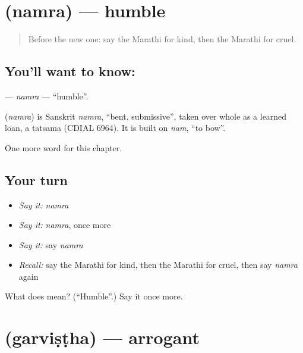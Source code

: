 \section[\texorpdfstring{\mr{नम्र} (namra)}{नम्र (namra)}]{ (namra) — humble}

\label{lesson:MR-C177-namra}



\begin{quote}
Before the new one: say the Marathi for kind, then the Marathi for cruel.
\end{quote}

\subsection*{You'll want to know: }
\textbf{} — \emph{namra} — \textquotedblleft{}humble\textquotedblright{}.

\begin{cousinweb}
\textbf{} (\emph{namra}) is Sanskrit \emph{namra}, \textquotedblleft{}bent, submissive\textquotedblright{}, taken over whole as a learned loan, a tatsama (CDIAL 6964). It is built on \emph{nam}, \textquotedblleft{}to bow\textquotedblright{}.
\end{cousinweb}

\begin{grammarlens}[title={What you've built}]
One more word for this chapter.
\end{grammarlens}

\subsection*{Your turn}
\begin{itemize}
\raggedright
  \item \emph{Say it:} \emph{namra}
  \item \emph{Say it:} \emph{namra}, once more
  \item \emph{Say it:} say \emph{namra}
  \item \emph{Recall:} say the Marathi for kind, then the Marathi for cruel, then say \emph{namra} again
\end{itemize}

\begin{tcolorbox}[breakable,colback=teal!4,colframe=teal!35!black,title={Before you move on}]
What does  mean? (\textquotedblleft{}Humble\textquotedblright{}.) Say it once more.
\end{tcolorbox}
\section[\texorpdfstring{\mr{गर्विष्ठ} (garviṣṭha)}{गर्विष्ठ (garviṣṭha)}]{ (garviṣṭha) — arrogant}

